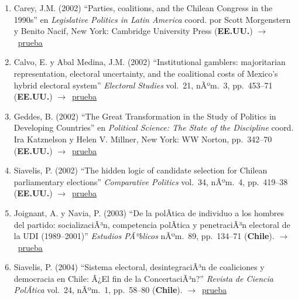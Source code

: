 \documentclass[12 pt, letter]{article}
\newenvironment{CitasMiTrabajo}{
    \begin{footnotesize}
    \begin{enumerate}[label={\footnotesize\emph{cita~\arabic*}},ref=\arabic*] %
        \setlength{\itemsep}{.1\itemsep}
        \setlength{\parskip}{.1\parskip}
    }{\end{enumerate}\end{footnotesize}}
\begin{document}
\begin{CitasMiTrabajo}
        \item Carey, J.M. (2002)
        ``Parties, coalitions, and the Chilean Congress in the 1990s''
        en \emph{Legislative Politics in Latin America}
        coord. por Scott Morgenstern y Benito Nacif, New York: Cambridge
        University Press (\textbf{EE.UU.}) $\rightarrow$~\href{http://ericmagar.com/cv/cites/mrs/careyInMorgNacif.pdf}{prueba}

        \item Calvo, E. y Abal Medina, J.M. (2002)
        ``Institutional
        gamblers: majoritarian representation, electoral uncertainty, and the
        coalitional costs of Mexico's hybrid electoral system''
        \emph{Electoral Studies} vol.\ 21, nÃºm.\ 3, pp.\ 453--71 (\textbf{EE.UU.}) $\rightarrow$~\href{http://ericmagar.com/cv/cites/mrs/calvoMedina.pdf}{prueba}

        \item Geddes, B. (2002)
        ``The Great Transformation in the
        Study of Politics in Developing Countries'' en \emph{Political Science: The
        State of the Discipline} coord. Ira Katznelson y Helen V. Millner,
        New York: WW Norton, pp.\ 342--70  (\textbf{EE.UU.}) $\rightarrow$~\href{http://ericmagar.com/cv/cites/mrs/geddesStateOfDisc.pdf}{prueba}

        \item Siavelis, P. (2002)
        ``The hidden logic of candidate selection
        for Chilean parliamentary elections'' \emph{Comparative Politics}
        vol.\ 34, nÃºm.\ 4, pp.\ 419--38 (\textbf{EE.UU.}) $\rightarrow$~\href{http://ericmagar.com/cv/cites/mrs/siavels2002cp.pdf}{prueba}

        \item Joignant, A. y Navia, P. (2003)
        ``De la polÃ­tica de individuo a los hombres del partido: socializaciÃ³n, competencia polÃ­tica y penetraciÃ³n electoral
        de la UDI (1989--2001)'' \emph{Estudios PÃºblicos} nÃºm.\ 89, pp.\ 134--71 (\textbf{Chile}). $\rightarrow$~\href{http://ericmagar.com/cv/cites/mrs/joigNavia.pdf}{prueba}

        \item Siavelis, P. (2004)
        ``Sistema electoral, desintegraciÃ³n de coaliciones y democracia en Chile: Â¿El fin de la ConcertaciÃ³n?''
        \emph{Revista de Ciencia PolÃ­tica} vol.\ 24, nÃºm.\ 1, pp.\ 58--80  (\textbf{Chile}). $\rightarrow$~\href{http://ericmagar.com/cv/cites/mrs/siavelis2004rcp.pdf}{prueba}


\end{CitasMiTrabajo}
\end{document}
